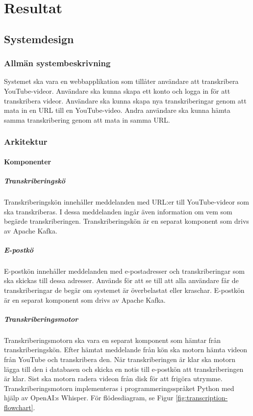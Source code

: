\chapter{Resultat}

\section{Systemdesign}

\subsection{Allmän systembeskrivning}
Systemet ska vara en webbapplikation som tillåter användare att transkribera
YouTube-videor. Användare ska kunna skapa ett konto och logga in för att
transkribera videor. Användare ska kunna skapa nya transkriberingar genom att
mata in en URL till en YouTube-video. Andra användare ska kunna hämta samma
transkribering genom att mata in samma URL.

\subsection{Arkitektur}

\subsubsection{Komponenter}

\paragraph{Transkriberingskö}
Transkriberingskön innehåller meddelanden med URL:er till YouTube-videor som
ska transkriberas. I dessa meddelanden ingår även information om vem som
begärde transkriberingen. Transkriberingskön är en separat komponent som drivs
av Apache Kafka.

\paragraph{E-postkö}
E-postkön innehåller meddelanden med e-postadresser och transkriberingar som
ska skickas till dessa adresser. Används för att se till att alla användare
får de transkriberingar de begär om systemet är överbelastat eller kraschar.
E-postkön är en separat komponent som drivs av Apache Kafka.

\paragraph{Transkriberingsmotor}
Transkriberingsmotorn ska vara en separat komponent som hämtar från
transkriberingskön. Efter hämtat meddelande från kön ska motorn hämta videon
från YouTube och transkribera den. När transkriberingen är klar ska motorn
lägga till den i databasen och skicka en notis till e-postkön att
transkriberingen är klar. Sist ska motorn radera videon från disk för att
frigöra utrymme. Transkriberingsmotorn implementeras i programmeringsspråket
Python med hjälp av OpenAI:s Whisper. För flödesdiagram, se Figur \ref{fig:transcription-flowchart}.

